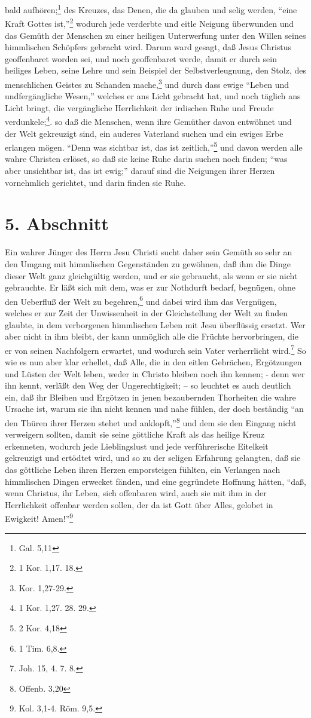 bald aufhören;\footnote{Gal. 5,11} des Kreuzes, das Denen, die da glauben und
selig werden, "`eine Kraft Gottes ist,"'\footnote{1 Kor. 1,17. 18.} wodurch jede
verderbte und eitle Neigung überwunden und das Gemüth der Menschen zu einer
heiligen Unterwerfung unter den Willen seines himmlischen Schöpfers gebracht
wird. Darum ward gesagt, daß Jesus Christus geoffenbaret worden sei, und noch
geoffenbaret werde, damit er durch sein heiliges Leben, seine Lehre und sein
Beispiel der Selbstverleugnung, den Stolz, des menschlichen Geistes zu Schanden
mache,\footnote{Kor. 1,27-29.} und durch dass ewige "`Leben und undfergängliche
Wesen,"' welches er ans Licht gebracht hat, und noch täglich ans Licht bringt,
die vergängliche Herrlichkeit der irdischen Ruhe und Freude
verdunkele;\footnote{1 Kor. 1,27. 28. 29.}. so daß die Menschen, wenn ihre
Gemüther davon entwöhnet und der Welt gekreuzigt sind, ein auderes Vaterland
suchen und ein ewiges Erbe erlangen mögen. "`Denn was sichtbar ist, das ist
zeitlich,"'\footnote{2 Kor. 4,18} und davon werden alle wahre Christen erlöset,
so daß sie keine Ruhe darin suchen noch finden; "`was aber unsichtbar ist, das
ist ewig;"' darauf sind die Neigungen ihrer Herzen vornehmlich gerichtet, und
darin finden sie Ruhe.

\section{5. Abschnitt} \label{kap16_ab5}

Ein wahrer Jünger des Herrn Jesu Christi sucht daher sein Gemüth so sehr an den
Umgang mit himmlischen Gegenständen zu gewöhnen, daß ihm die Dinge dieser Welt
ganz gleichgültig werden, und er sie gebraucht, als wenn er sie nicht
gebrauchte. Er läßt sich mit dem, was er zur Nothdurft bedarf, begnügen, ohne
den Ueberfluß der Welt zu begehren,\footnote{1 Tim. 6,8.} und dabei wird ihm das
Vergnügen, welches er zur Zeit der Unwissenheit in der Gleichstellung der Welt
zu finden glaubte, in dem verborgenen himmlischen Leben mit Jesu überflüssig
ersetzt. Wer aber nicht in ihm bleibt, der kann unmöglich alle die Früchte
hervorbringen, die er von seinen Nachfolgern erwartet, und wodurch sein Vater
verherrlicht wird.\footnote{Joh. 15, 4. 7. 8.} So wie es nun aber klar erhellet,
daß Alle, die in den eitlen Gebrächen, Ergötzungen und Lüsten der Welt leben,
weder in Christo bleiben noch ihn kennen; - denn wer ihn kennt, verläßt den Weg
der Ungerechtigkeit; -- so leuchtet es auch deutlich ein, daß ihr Bleiben und
Ergötzen in jenen bezaubernden Thorheiten die wahre Ursache ist, warum sie ihn
nicht kennen und nahe fühlen, der doch beständig "`an den Thüren ihrer Herzen
stehet und anklopft,"'\footnote{Offenb. 3,20} und dem sie den Eingang nicht
verweigern sollten, damit sie seine göttliche Kraft als das heilige Kreuz
erkenneten, wodurch jede Lieblingslust und jede verführerische Eitelkeit
gekreuzigt und ertödtet wird, und so zu der seligen Erfahrung gelangten, daß sie
das göttliche Leben ihren Herzen emporsteigen fühlten, ein Verlangen nach
himmlischen Dingen erwecket fänden, und eine gegründete Hoffnung hätten, "`daß,
wenn Christus, ihr Leben, sich offenbaren wird, auch sie mit ihm in der
Herrlichkeit offenbar werden sollen, der da ist Gott über Alles, gelobet in
Ewigkeit! Amen!"'\footnote{Kol. 3,1-4. Röm. 9,5.}
